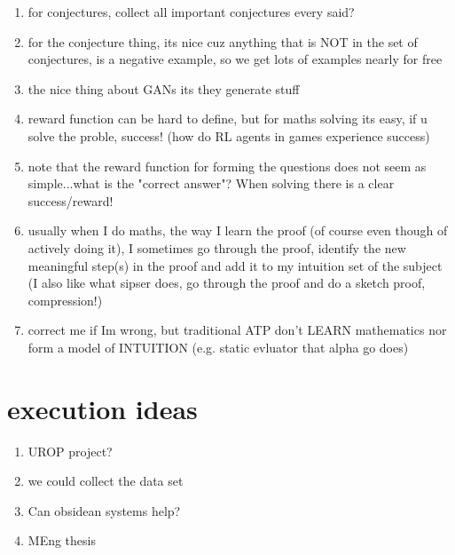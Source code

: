 \documentclass[11pt]{article}
\begin{document}
\begin{enumerate}
\item for conjectures, collect all important conjectures every said?
\item for the conjecture thing, its nice cuz anything that is NOT in the set of conjectures, is a negative example, so we get lots of examples nearly for free
\item the nice thing about GANs its they generate stuff
\item reward function can be hard to define, but for maths solving its easy, if u solve the proble, success! (how do RL agents in games experience success)
\item note that the reward function for forming the questions does not seem as simple...what is the "correct answer"? When solving there is a clear success/reward!
\item usually when I do maths, the way I learn the proof (of course even though of actively doing it), I sometimes go through the proof, identify the new meaningful step(s) in the proof and add it to my intuition set of the subject (I also like what sipser does, go through the proof and do a sketch proof, compression!)
\item correct me if Im wrong, but traditional ATP don't LEARN mathematics nor form a model of INTUITION (e.g. static evluator that alpha go does)
\end{enumerate}

\section{execution ideas}

\begin{enumerate}
\item UROP project?
\item we could collect the data set
\item Can obsidean systems help?
\item MEng thesis
\end{enumerate}

\printbibliography
\end{document}
